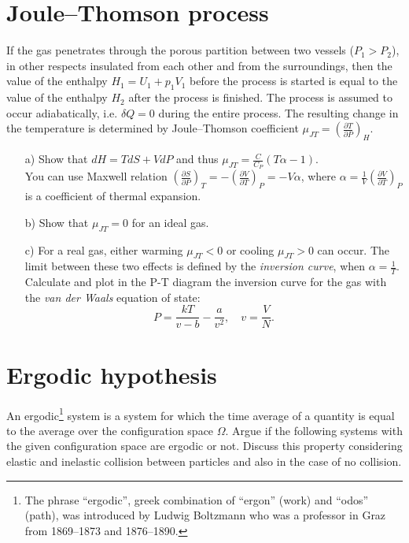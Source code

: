 \documentclass[12pt,a4paper]{article} %
\begin{document}
 
 
 \section{Joule–Thomson process}
 If the gas penetrates through the porous partition between two vessels ($P_1 > P_2$), in other respects insulated from each other and from the surroundings, then the value of the enthalpy $H_1 = U_1 +p_1 V_1$ before the process is started is equal to the value of the enthalpy $H_2$ after the process is finished. The process is assumed to occur adiabatically, i.e. $\delta Q  =0$ during the entire process. The resulting change in the temperature is determined by Joule–Thomson coefficient $\mu_{JT} = \left( \frac{\partial T}{\partial P} \right)_H$.
  \begin{itemize}
   \item[a)] Show that \quad $dH = TdS + VdP$ \quad and thus \quad $\mu_{JT} = \frac{C}{C_P}(T \alpha - 1).$ \\
   You can use Maxwell relation $\left( \frac{\partial S}{\partial P} \right)_T  = - \left( \frac{\partial V}{\partial T} \right)_P = - V \alpha$, where $\alpha = \frac{1}{V} \left( \frac{\partial V}{\partial T} \right)_P$ is a coefficient of thermal expansion.
   \item[b)] Show that $\mu_{JT} = 0$ for an ideal gas.
   \item[c)] For a real gas, either warming $\mu_{JT} < 0$ or cooling $\mu_{JT} > 0$ can occur. The limit between these two effects is defined by the \textit{inversion curve}, when $\alpha = \frac{1}{T}$. \\
   Calculate and plot in the P-T diagram the inversion curve for the gas with the \textit{van der Waals} equation of state: 
   $$ P = \frac{kT}{v-b} - \frac{a}{v^2} , \quad v = \frac{V}{N}.$$



\end{itemize}


\section{Ergodic hypothesis}

An ergodic\footnote{The phrase ``ergodic'', greek combination of ``ergon'' (work) and ``odos'' (path), was introduced by Ludwig Boltzmann who was a professor in Graz from 1869–1873 and 1876–1890.} system is a system for which the time average of a quantity is equal to the average over the configuration space $\Omega$. Argue if the following systems with the given configuration space are ergodic or not. Discuss this property considering elastic and inelastic collision between particles and also in the case of no collision. 
\end{document}
